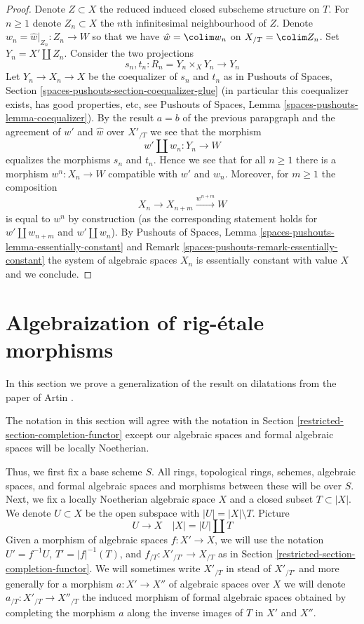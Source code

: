 \begin{proof}
\medskip\noindent
Denote $Z \subset X$ the reduced induced closed subscheme structure
on $T$. For $n \geq 1$ denote $Z_n \subset X$ the $n$th infinitesimal
neighbourhood of $Z$. Denote $w_n = \hat w|_{Z_n} : Z_n \to W$
so that we have $\hat w = \colim w_n$ on $X_{/T} = \colim Z_n$.
Set $Y_n = X' \amalg Z_n$. Consider the two projections
$$
s_n, t_n : R_n = Y_n \times_X Y_n \longrightarrow Y_n
$$
Let $Y_n \to X_n \to X$ be the coequalizer of $s_n$ and $t_n$ as in
Pushouts of Spaces, Section \ref{spaces-pushouts-section-coequalizer-glue}
(in particular this coequalizer exists, has good properties, etc, see
Pushouts of Spaces, Lemma \ref{spaces-pushouts-lemma-coequalizer}).
By the result $a = b$ of the previous parapgraph and the agreement
of $w'$ and $\hat w$ over $X'_{/T}$ we see that the morphism
$$
w' \amalg w_n : Y_n \longrightarrow W
$$
equalizes the morphisms $s_n$ and $t_n$. Hence we see that for all $n \geq 1$
there is a morphism $w^n : X_n \to W$ compatible with $w'$ and $w_n$.
Moreover, for $m \geq 1$ the composition
$$
X_n \to X_{n + m} \xrightarrow{w^{n + m}} W
$$
is equal to $w^n$ by construction (as the corresponding statement holds
for $w' \amalg w_{n + m}$ and $w' \amalg w_n$). By
Pushouts of Spaces, Lemma
\ref{spaces-pushouts-lemma-essentially-constant} and
Remark \ref{spaces-pushouts-remark-essentially-constant}
the system of algebraic spaces $X_n$ is essentially constant
with value $X$ and we conclude.
\end{proof}

\section{Algebraization of rig-\'etale morphisms}
\label{restricted-section-algebraization}
In this section we prove a generalization of the result on dilatations
from the paper of Artin \cite{ArtinII}.

\medskip\noindent
The notation in this section will agree with the notation in
Section \ref{restricted-section-completion-functor} except our algebraic
spaces and formal algebraic spaces will be locally Noetherian.

\medskip\noindent
Thus, we first fix a base scheme $S$. All rings, topological rings,
schemes, algebraic spaces, and formal algebraic spaces and
morphisms between these will be over $S$. Next, we fix a
locally Noetherian algebraic space $X$ and a closed subset $T \subset |X|$.
We denote $U \subset X$ be the open subspace with $|U| = |X| \setminus T$.
Picture
$$
U \to X \quad |X| = |U| \amalg T
$$
Given a morphism of algebraic spaces $f : X' \to X$, we will use the notation
$U' = f^{-1}U$, $T' = |f|^{-1}(T)$, and $f_{/T} : X'_{/T'} \to X_{/T}$ as in
Section \ref{restricted-section-completion-functor}. We will sometimes write
$X'_{/T}$ in stead of $X'_{/T'}$ and more generally for a morphism
$a : X' \to X''$ of algebraic spaces over $X$ we will denote
$a_{/T} : X'_{/T} \to X''_{/T}$ the induced morphism of formal
algebraic spaces obtained by completing the morphism $a$ along
the inverse images of $T$ in $X'$ and $X''$.

